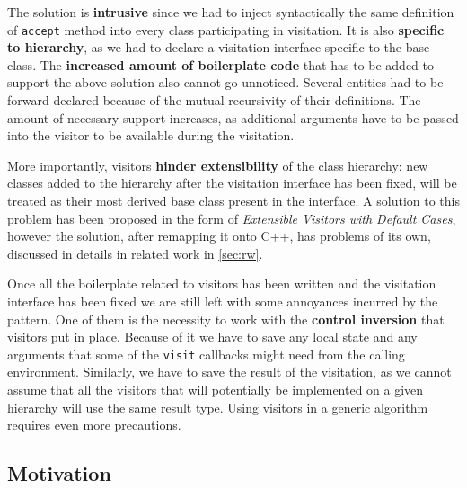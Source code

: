 \documentclass[preprint]{sigplanconf}
\makeatletter
\DeclareRobustCommand{\code}[1]{{\lstinline[breaklines=false,escapechar=@]{#1}}}
\makeatother
\begin{document}
The solution is {\bf intrusive} since we had to inject syntactically the same 
definition of \code{accept} method into every class participating in visitation. 
It is also {\bf specific to hierarchy}, as we had to declare a visitation 
interface specific to the base class. The {\bf increased amount of boilerplate 
code} that has to be added to support the above solution also cannot go unnoticed. 
Several entities had to be forward declared because of the mutual recursivity of 
their definitions. The amount of necessary support increases, as additional 
arguments have to be passed into the visitor to be available during the 
visitation.

More importantly, visitors {\bf hinder extensibility} of the class hierarchy: 
new classes added to the hierarchy after the visitation interface has been 
fixed, will be treated as their most derived base class present in the interface.
A solution to this problem has been proposed in the form of \emph{Extensible 
Visitors with Default Cases}\cite[]{Zenger:2001}, however the 
solution, after remapping it onto C++, has problems of its own, discussed in 
details in related work in \textsection\ref{sec:rw}.

Once all the boilerplate related to visitors has been written and the visitation 
interface has been fixed we are still left with some annoyances incurred by the 
pattern. One of them is the necessity to work with the {\bf control inversion} 
that visitors put in place. Because of it we have to save any local state and 
any arguments that some of the \code{visit} callbacks might need from the 
calling environment. Similarly, we have to save the result of the visitation, 
as we cannot assume that all the visitors that will potentially be implemented 
on a given hierarchy will use the same result type. Using visitors in a generic 
algorithm requires even more precautions.

\subsection{Motivation}
\end{document}

